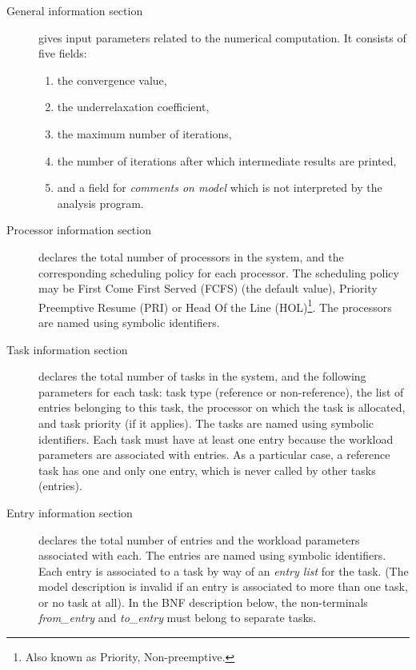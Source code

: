 \documentclass{article}
\begin{document}
\begin{description}
\item [General information section] gives input parameters related to
  the numerical computation.  It consists of five fields:
  \begin{enumerate}
  \item the convergence value,
  \item the underrelaxation coefficient,
  \item the maximum number of iterations,
  \item the number of iterations after which intermediate results
    are printed,
  \item and a field for {\em comments on model} which is not
    interpreted by the analysis program.
  \end{enumerate}
  
\item [Processor information section] declares the total number of
  processors in the system, and the corresponding scheduling policy for
  each processor.  The scheduling policy may be First Come First Served
  (FCFS) (the default value), Priority Preemptive Resume (PRI) or Head
  Of the Line (HOL)\footnote{Also known as Priority, Non-preemptive.}.
  The processors are named using symbolic identifiers.
  
\item [Task information section] declares the total number of tasks in
  the system, and the following parameters for each task: task type
  (reference or non-reference), the list of entries belonging to this
  task, the processor on which the task is allocated, and task priority
  (if it applies). The tasks are named using symbolic identifiers. Each
  task must have at least one entry because the workload parameters are
  associated with entries.  As a particular case, a reference task has
  one and only one entry, which is never called by other tasks
  (entries).
  
\item [Entry information section] declares the total number of entries
  and the workload parameters associated with each. The entries are
  named using symbolic identifiers. Each entry is associated to a task
  by way of an {\em entry list} for the task. (The model description is
  invalid if an entry is associated to more than one task, or no task at
  all).  In the BNF description below, the non-terminals {\em
  from\_entry\/} and {\em to\_entry\/} must belong to separate tasks.


\end{description}
\end{document}
